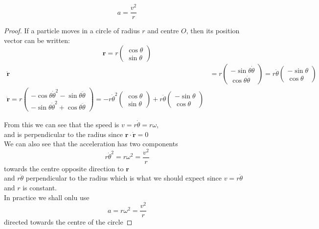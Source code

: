 \documentclass[a4paper]{article}
\begin{document}
\begin{prop}
	\[
		a=\frac{v^2}{r}
	\]
	\begin{proof}
		If a particle moves in a circle of radius $r$ and centre $O$, then its position vector can be written:
		\[
			\mathbf{r}=r\begin{pmatrix}\cos\theta\\ \sin\theta \end{pmatrix}
        \]
        \begin{align*}
        \mathbf{\dot{r}}&=r\begin{pmatrix}-\sin\theta \dot{\theta}\\ \cos\theta\dot{\theta}\end{pmatrix}=r\dot{\theta}\begin{pmatrix}-\sin\theta\\ \cos\theta \end{pmatrix}\\
        \mathbf{\ddot{r}}=r\begin{pmatrix}-\cos\theta\dot{\theta}^2-\sin\theta\ddot{\theta}\\-\sin\theta\dot{\theta}^2+\cos\theta\ddot{\theta}\end{pmatrix}=-r\dot{\theta}^2\begin{pmatrix}\cos\theta\\\sin\theta\end{pmatrix}+r\ddot{\theta}\begin{pmatrix}-\sin\theta\\\cos\theta\end{pmatrix}
        \end{align*}

        From this we can see that the speed is $v=r\dot{\theta}=r\omega$,\\
        and is perpendicular to the radius since $\mathbf{r\cdot\dot{r}}=0$\\
        
        We can also see that the acceleration has two components
        \[
            r\dot{\theta}^2=r\omega^2=\frac{v^2}{r}
        \]
        towards the centre opposite direction to $\mathbf{r}$\\
        
        and $r\ddot{\theta}$ perpendicular to the radius which is what we should expect since $v=r\dot{\theta}$ and $r$ is constant.\\
        
        In practice we shall onlu use 
        \[
            a=r\omega^2=\frac{v^2}{r}
        \]
        directed towards the centre of the circle
	\end{proof}
\end{prop}
\end{document}
